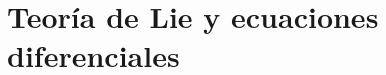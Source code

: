 % 
% 
% 
% 
% 
% 
% 
% 
% 
% 
% 
% 
% 
% 
% 
% 



\chapter{Teoría de Lie y ecuaciones diferenciales}



%


